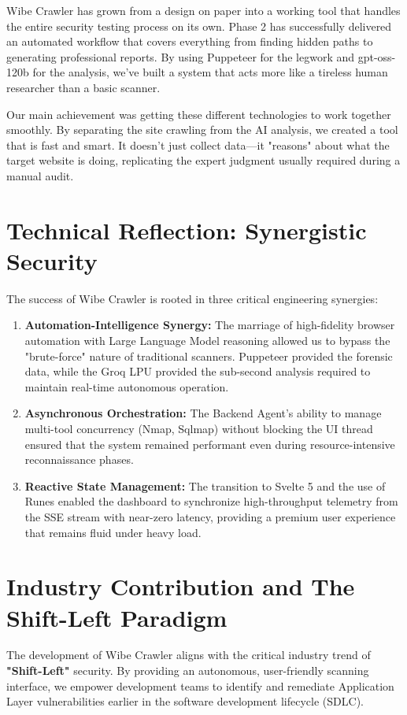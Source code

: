 \documentclass[12pt,oneside,a4paper]{book}
\begin{document}
Wibe Crawler has grown from a design on paper into a working tool that handles the entire security testing process on its own. Phase 2 has successfully delivered an automated workflow that covers everything from finding hidden paths to generating professional reports. By using Puppeteer for the legwork and gpt-oss-120b for the analysis, we've built a system that acts more like a tireless human researcher than a basic scanner.

Our main achievement was getting these different technologies to work together smoothly. By separating the site crawling from the AI analysis, we created a tool that is fast and smart. It doesn't just collect data—it "reasons" about what the target website is doing, replicating the expert judgment usually required during a manual audit.

\section{Technical Reflection: Synergistic Security}
The success of Wibe Crawler is rooted in three critical engineering synergies:
\begin{enumerate}
    \item \textbf{Automation-Intelligence Synergy:} The marriage of high-fidelity browser automation with Large Language Model reasoning allowed us to bypass the "brute-force" nature of traditional scanners. Puppeteer provided the forensic data, while the Groq LPU provided the sub-second analysis required to maintain real-time autonomous operation.
    \item \textbf{Asynchronous Orchestration:} The Backend Agent's ability to manage multi-tool concurrency (Nmap, Sqlmap) without blocking the UI thread ensured that the system remained performant even during resource-intensive reconnaissance phases.
    \item \textbf{Reactive State Management:} The transition to Svelte 5 and the use of Runes enabled the dashboard to synchronize high-throughput telemetry from the SSE stream with near-zero latency, providing a premium user experience that remains fluid under heavy load.
\end{enumerate}

\section{Industry Contribution and The Shift-Left Paradigm}
The development of Wibe Crawler aligns with the critical industry trend of \textbf{"Shift-Left"} security. By providing an autonomous, user-friendly scanning interface, we empower development teams to identify and remediate Application Layer vulnerabilities earlier in the software development lifecycle (SDLC). 
\end{document}
